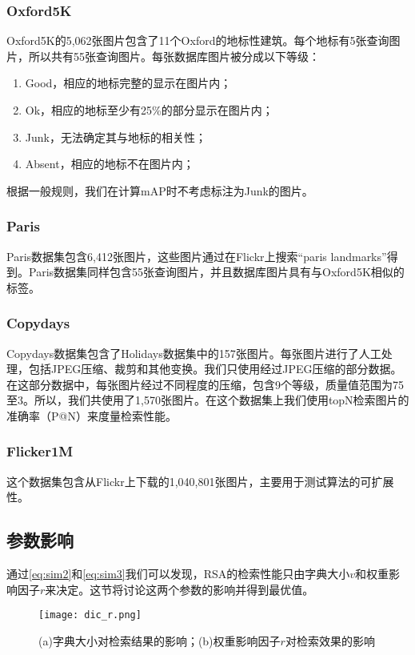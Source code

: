 \subsubsection{Oxford5K}
Oxford5K的5,062张图片包含了11个Oxford的地标性建筑。每个地标有5张查询图片，所以共有55张查询图片。每张数据库图片被分成以下等级：
\begin{enumerate}
	\item Good，相应的地标完整的显示在图片内；
	\item Ok，相应的地标至少有25\%的部分显示在图片内；
	\item Junk，无法确定其与地标的相关性；
	\item Absent，相应的地标不在图片内；
\end{enumerate}

根据一般规则，我们在计算mAP时不考虑标注为Junk的图片。

\subsubsection{Paris}
Paris数据集包含6,412张图片，这些图片通过在Flickr上搜索“paris landmarks”得到。Paris数据集同样包含55张查询图片，并且数据库图片具有与Oxford5K相似的标签。

\subsubsection{Copydays}
Copydays数据集包含了Holidays数据集中的157张图片。每张图片进行了人工处理，包括JPEG压缩、裁剪和其他变换。我们只使用经过JPEG压缩的部分数据。在这部分数据中，每张图片经过不同程度的压缩，包含9个等级，质量值范围为75至3。所以，我们共使用了1,570张图片。在这个数据集上我们使用topN检索图片的准确率（P@N）来度量检索性能。

\subsubsection{Flicker1M}
这个数据集包含从Flickr上下载的1,040,801张图片，主要用于测试算法的可扩展性。

\subsection{参数影响}
通过\ref{eq:sim2}和\ref{eq:sim3}我们可以发现，RSA的检索性能只由字典大小$v$和权重影响因子$r$来决定。这节将讨论这两个参数的影响并得到最优值。
\begin{figure}[h]
	\centering
	\texttt{[image: dic\_r.png]}
	\caption{(a)字典大小对检索结果的影响；(b)权重影响因子$r$对检索效果的影响}\label{fig:dr}
\end{figure}

